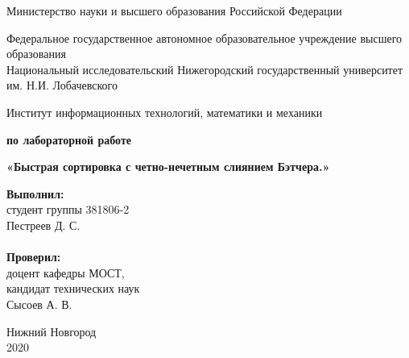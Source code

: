 \documentclass{report}
\begin{document}
\begin{titlepage}

\begin{center}
Министерство науки и высшего образования Российской Федерации
\end{center}

\begin{center}
Федеральное государственное автономное образовательное учреждение высшего образования \\
Национальный исследовательский Нижегородский государственный университет им. Н.И. Лобачевского
\end{center}

\begin{center}
Институт информационных технологий, математики и механики
\end{center}

\vspace{4em}

\begin{center}
\textbf{ по лабораторной работе} \\
\end{center}
\begin{center}
\textbf{\Large «Быстрая сортировка с четно-нечетным слиянием Бэтчера.»}
\vspace{4em}
\end{center}
\newbox{\lbox}
\newlength{\maxl}
\setlength{\maxl}{\wd\lbox}
\hfill\parbox{7cm}{
\hspace*{5cm}\hspace*{-5cm}\textbf{Выполнил:} \\ студент группы 381806-2 \\ Пестреев Д. С.\\
\\
\hspace*{5cm}\hspace*{-5cm}\textbf{Проверил:}\\ доцент кафедры МОСТ, \\ кандидат технических наук \\ Сысоев А. В.\\
}
\vspace{\fill}

\begin{center} Нижний Новгород \\ 2020 \end{center}

\end{titlepage}
\end{document}
